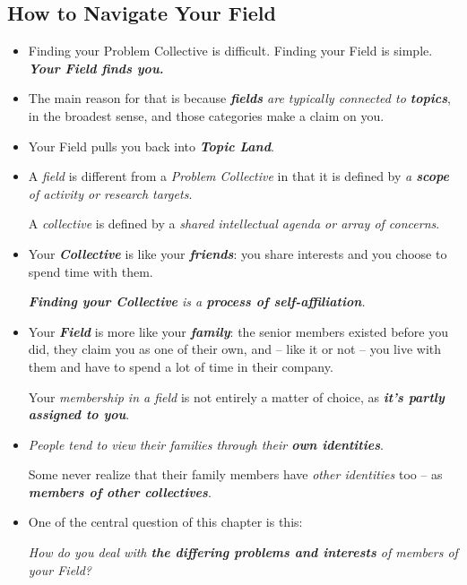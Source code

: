\documentclass[11pt]{article}
\begin{document}
\subsection{How to Navigate Your Field}
\begin{itemize}
\item Finding your Problem Collective is difficult. Finding your Field is simple. \emph{\textbf{Your Field finds you.}}

\item The main reason for that is because \emph{\textbf{fields} are typically connected to \textbf{topics}}, in the broadest sense, and those categories make a claim on you. 

\item Your Field pulls you back into \emph{\textbf{Topic Land}}.

\item A \emph{field} is different from a \emph{Problem Collective} in that it is defined by \emph{a \textbf{scope} of activity or research targets}. 

A \emph{collective} is defined by a \emph{shared intellectual agenda or array of concerns}.

\item Your \emph{\textbf{Collective}} is like your \emph{\textbf{friends}}: you share interests and you choose to spend time with them. 

\emph{\textbf{Finding your Collective} is a \textbf{process of self-affiliation}. }

\item Your \emph{\textbf{Field}} is more like your \emph{\textbf{family}}: the senior members existed before you did, they claim you as one of their own, and -- like it or not -- you live with them and have to spend a lot of time in their company.

Your \emph{membership in a field} is not entirely a matter of choice, as \emph{\textbf{it’s partly assigned to you}}.

\item \emph{People tend to view their families through their \textbf{own identities}}. 

Some never realize that their family members have \emph{other identities} too -- as \emph{\textbf{members of other collectives}}.

\item One of the central question of this chapter is this: 

\emph{How do you deal with \textbf{the differing problems and interests} of members of your Field?}


\end{itemize}
\end{document}
